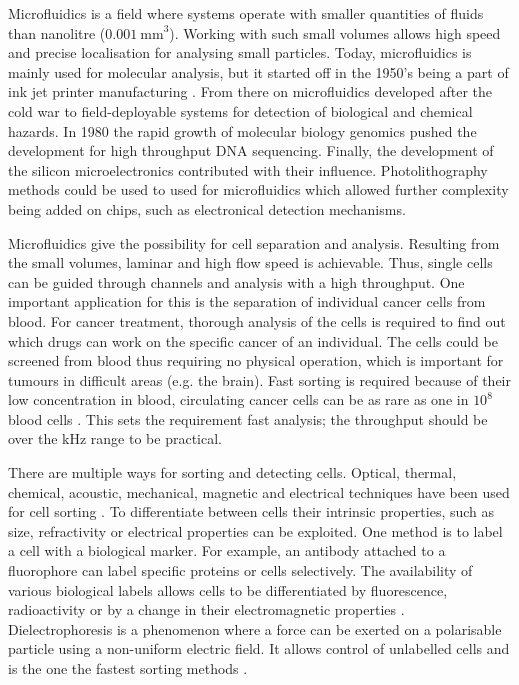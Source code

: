\documentclass[final]{jyflluk}
\begin{document}
Microfluidics is a field where systems operate with smaller quantities of fluids than nanolitre ($\SI{0.001}{\milli \metre}^3$). Working with such small volumes allows high speed and precise localisation for analysing small particles. Today, microfluidics is mainly used for molecular analysis, but it started off in the 1950’s being a part of ink jet printer manufacturing \cite{gervais_microfluidic_2011}. From there on microfluidics developed after the cold war to field-deployable systems for detection of biological and chemical hazards. In 1980 the rapid growth of molecular biology genomics pushed the development for high throughput DNA sequencing. Finally, the development of the silicon microelectronics contributed with their influence. Photolithography methods could be used to used for microfluidics which allowed further complexity being added on chips, such as electronical detection mechanisms. \cite{whitesides_origins_2006}

Microfluidics give the possibility for cell separation and analysis. Resulting from the small volumes, laminar and high flow speed is achievable. Thus, single cells can be guided through channels and analysis with a high throughput. One important application for this is the separation of individual cancer cells from blood. For cancer treatment, thorough analysis of the cells is required to find out which drugs can work on the specific cancer of an individual. The cells could be screened from blood thus requiring no physical operation, which is important for tumours in difficult areas (e.g. the brain). Fast sorting is required because of their low concentration in blood, circulating cancer cells can be as rare as one in $10^8$ blood cells \cite{huang_enrichment_2013}. This sets the requirement fast analysis; the throughput should be over the kHz range to be practical. 

There are multiple ways for sorting and detecting cells. Optical, thermal, chemical, acoustic, mechanical, magnetic and electrical techniques have been used for cell sorting \cite{ahn_dielectrophoretic_2006,zhang_towards_2015, voldman_electrical_2006}. To differentiate between cells their intrinsic properties, such as size, refractivity or electrical properties can be exploited. One method is to label a cell with a biological marker.  For example, an antibody attached to a fluorophore can label specific proteins or cells selectively. The availability of various biological labels allows cells to be differentiated by fluorescence, radioactivity or by a change in their electromagnetic properties \cite{wilhelm_universal_2008}. Dielectrophoresis is a phenomenon where a force can be exerted on a polarisable particle using a non-uniform electric field. It allows control of unlabelled cells and is the one the fastest sorting methods \cite{zhang_towards_2015}.
\end{document}
